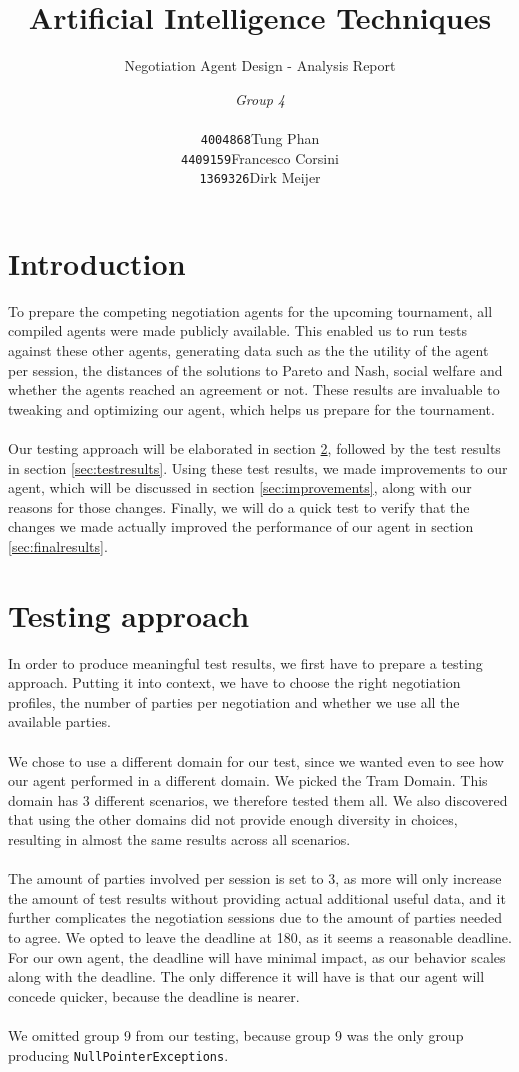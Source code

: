 \documentclass[a4,11pt]{scrartcl}
\title{Artificial Intelligence Techniques}
\subtitle{Negotiation Agent Design - Analysis Report}
\author{\emph{Group 4}\\
\begin{tabular}{ll}
\texttt{4004868}&Tung Phan\\
\texttt{4409159}&Francesco Corsini\\
\texttt{1369326}&Dirk Meijer
\end{tabular}}
\begin{document}
\maketitle

\null\vfill
\tableofcontents
\pagebreak

\section{Introduction}
To prepare the competing negotiation agents for the upcoming tournament, all compiled agents were made publicly available. This enabled us to run tests against these other agents, generating data such as the the utility of the agent per session, the distances of the solutions to Pareto and Nash, social welfare and whether the agents reached an agreement or not. These results are invaluable to tweaking and optimizing our agent, which helps us prepare for the tournament.
\\ \\
Our testing approach will be elaborated in section \ref{sec:testingapproach}, followed by the test results in section \ref{sec:testresults}. Using these test results, we made improvements to our agent, which will be discussed in section \ref{sec:improvements}, along with our reasons for those changes. Finally, we will do a quick test to verify that the changes we made actually improved the performance of our agent in section \ref{sec:finalresults}.
    
\section{Testing approach}
\label{sec:testingapproach}
In order to produce meaningful test results, we first have to prepare a testing approach. Putting it into context, we have to choose the right negotiation profiles, the number of parties per negotiation and whether we use all the available parties.
\\ \\
We chose to use a different domain for our test, since we wanted even to see how our agent performed in a different domain. We picked the Tram Domain. This domain has 3 different scenarios, we therefore tested them all. We also discovered that using the other domains did not provide enough diversity in choices, resulting in almost the same results across all scenarios. 
\\ \\
The amount of parties involved per session is set to 3, as more will only increase the amount of test results without providing actual additional useful data, and it further complicates the negotiation sessions due to the amount of parties needed to agree.
We opted to leave the deadline at 180, as it seems a reasonable deadline. For our own agent, the deadline will have minimal impact, as our behavior scales along with the deadline. The only difference it will have is that our agent will concede quicker, because the deadline is nearer.
\\ \\
We omitted group 9 from our testing, because group 9 was the only group producing \verb|NullPointerExceptions|.
\end{document}
